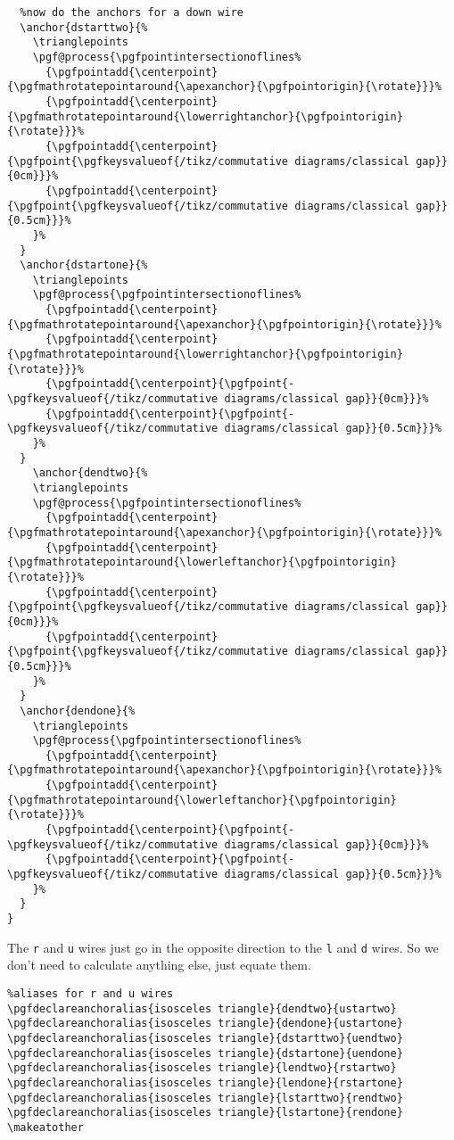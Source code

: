 \documentclass[aps,pra,10pt,nofootinbib]{revtex4-2}
\begin{document}
  \begin{FullCode}
  \begin{lstlisting}
  %now do the anchors for a down wire
  \anchor{dstarttwo}{%
    \trianglepoints
    \pgf@process{\pgfpointintersectionoflines%
      {\pgfpointadd{\centerpoint}{\pgfmathrotatepointaround{\apexanchor}{\pgfpointorigin}{\rotate}}}%
      {\pgfpointadd{\centerpoint}{\pgfmathrotatepointaround{\lowerrightanchor}{\pgfpointorigin}{\rotate}}}%
      {\pgfpointadd{\centerpoint}{\pgfpoint{\pgfkeysvalueof{/tikz/commutative diagrams/classical gap}}{0cm}}}%
      {\pgfpointadd{\centerpoint}{\pgfpoint{\pgfkeysvalueof{/tikz/commutative diagrams/classical gap}}{0.5cm}}}%
    }%
  }
  \anchor{dstartone}{%
    \trianglepoints
    \pgf@process{\pgfpointintersectionoflines%
      {\pgfpointadd{\centerpoint}{\pgfmathrotatepointaround{\apexanchor}{\pgfpointorigin}{\rotate}}}%
      {\pgfpointadd{\centerpoint}{\pgfmathrotatepointaround{\lowerrightanchor}{\pgfpointorigin}{\rotate}}}%
      {\pgfpointadd{\centerpoint}{\pgfpoint{-\pgfkeysvalueof{/tikz/commutative diagrams/classical gap}}{0cm}}}%
      {\pgfpointadd{\centerpoint}{\pgfpoint{-\pgfkeysvalueof{/tikz/commutative diagrams/classical gap}}{0.5cm}}}%
    }%
  }
    \anchor{dendtwo}{%
    \trianglepoints
    \pgf@process{\pgfpointintersectionoflines%
      {\pgfpointadd{\centerpoint}{\pgfmathrotatepointaround{\apexanchor}{\pgfpointorigin}{\rotate}}}%
      {\pgfpointadd{\centerpoint}{\pgfmathrotatepointaround{\lowerleftanchor}{\pgfpointorigin}{\rotate}}}%
      {\pgfpointadd{\centerpoint}{\pgfpoint{\pgfkeysvalueof{/tikz/commutative diagrams/classical gap}}{0cm}}}%
      {\pgfpointadd{\centerpoint}{\pgfpoint{\pgfkeysvalueof{/tikz/commutative diagrams/classical gap}}{0.5cm}}}%
    }%
  }
  \anchor{dendone}{%
    \trianglepoints
    \pgf@process{\pgfpointintersectionoflines%
      {\pgfpointadd{\centerpoint}{\pgfmathrotatepointaround{\apexanchor}{\pgfpointorigin}{\rotate}}}%
      {\pgfpointadd{\centerpoint}{\pgfmathrotatepointaround{\lowerleftanchor}{\pgfpointorigin}{\rotate}}}%
      {\pgfpointadd{\centerpoint}{\pgfpoint{-\pgfkeysvalueof{/tikz/commutative diagrams/classical gap}}{0cm}}}%
      {\pgfpointadd{\centerpoint}{\pgfpoint{-\pgfkeysvalueof{/tikz/commutative diagrams/classical gap}}{0.5cm}}}%
    }%
  }
}
\end{lstlisting}
\end{FullCode}
The \texttt{r} and \texttt{u} wires just go in the opposite direction to the \texttt{l} and \texttt{d} wires. So we don't need to calculate anything else, just equate them.
\begin{FullCode}
\begin{lstlisting}
%aliases for r and u wires
\pgfdeclareanchoralias{isosceles triangle}{dendtwo}{ustartwo}
\pgfdeclareanchoralias{isosceles triangle}{dendone}{ustartone}
\pgfdeclareanchoralias{isosceles triangle}{dstarttwo}{uendtwo}
\pgfdeclareanchoralias{isosceles triangle}{dstartone}{uendone}
\pgfdeclareanchoralias{isosceles triangle}{lendtwo}{rstartwo}
\pgfdeclareanchoralias{isosceles triangle}{lendone}{rstartone}
\pgfdeclareanchoralias{isosceles triangle}{lstarttwo}{rendtwo}
\pgfdeclareanchoralias{isosceles triangle}{lstartone}{rendone}
\makeatother
\end{lstlisting}
\end{FullCode}
\end{document}
